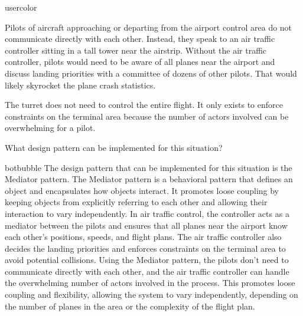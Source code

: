 \begin{chatquest}{usercolor}{}

Pilots of aircraft approaching or departing from the airport control area do not communicate directly with each other. Instead, they speak to an air traffic controller sitting in a tall tower near the airstrip. Without the air traffic controller, pilots would need to be aware of all planes near the airport and discuss landing priorities with a committee of dozens of other pilots. That would likely skyrocket the plane crash statistics.

The turret does not need to control the entire flight. It only exists to enforce constraints on the terminal area because the number of actors involved can be overwhelming for a pilot.

What design pattern can be implemented for this situation?
\end{chatquest}
\begin{chatout}{botbubble}{}
The design pattern that can be implemented for this situation is the Mediator pattern. The Mediator pattern is a behavioral pattern that defines an object and encapsulates how objects interact. It promotes loose coupling by keeping objects from explicitly referring to each other and allowing their interaction to vary independently.
In air traffic control, the controller acts as a mediator between the pilots and ensures that all planes near the airport know each other's positions, speeds, and flight plans. The air traffic controller also decides the landing priorities and enforces constraints on the terminal area to avoid potential collisions.
Using the Mediator pattern, the pilots don't need to communicate directly with each other, and the air traffic controller can handle the overwhelming number of actors involved in the process. This promotes loose coupling and flexibility, allowing the system to vary independently, depending on the number of planes in the area or the complexity of the flight plan.
\end{chatout}



